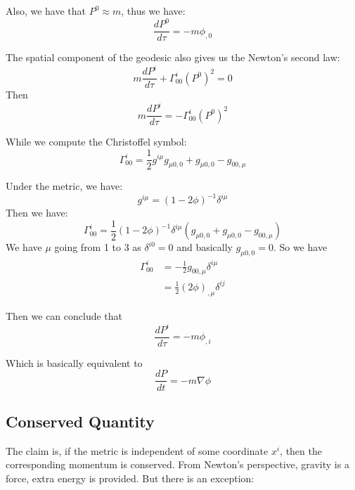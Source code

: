 \documentclass{article}
\begin{document}
Also, we have that $P^0\approx m$, thus we have:
\begin{equation}
    \frac{dP^0}{d\tau}=-m \phi_{,0}
\end{equation}

The spatial component of the geodesic also gives us the Newton's second law:
\begin{equation}
  m\frac{dP^i}{d\tau}+\Gamma^i_{00}(P^0)^2=0
\end{equation}
Then
\begin{equation}
    m\frac{dP^i}{d\tau}=-\Gamma^i_{00}(P^0)^2
\end{equation}

While we compute the Christoffel symbol:
\begin{equation}
    \Gamma^i_{00}=\frac{1}{2}g^{i\mu} g_{\mu0,0}+g_{\mu0,0}-g_{00,\mu}
\end{equation}

Under the metric, we have:
\begin{equation}
    g^{i\mu}=(1-2\phi)^{-1}\delta^{i\mu}
\end{equation}
Then we have:
\begin{equation}
    \Gamma^i_{00}=\frac{1}{2}(1-2\phi)^{-1}\delta^{i\mu}(g_{\mu0,0}+g_{\mu0,0}-g_{00,\mu})
\end{equation}
We have $\mu$ going from 1 to 3 as $\delta^{i0}=0$ and basically $g_{\mu0,0}=0$. So we have
\begin{equation}
    \begin{split}
    \Gamma^i_{00}&=-\frac{1}{2}g_{00,\mu}\delta^{i\mu}\\
    &=\frac{1}{2}(2\phi)_{,\mu}\delta^{ij}
    \end{split}
\end{equation}

Then we can conclude that
\begin{equation}
    \frac{dP^i}{d\tau}=-m\phi_{,i}
\end{equation}

Which is basically equivalent to
\begin{equation}
    \frac{dP}{dt}=-m\nabla\phi
\end{equation}

\subsection{Conserved Quantity}
The claim is, if the metric is independent of some coordinate $x^i$, then the corresponding momentum is conserved. From Newton's perspective, gravity is a force, extra energy is provided. But there is an exception:
\end{document}
